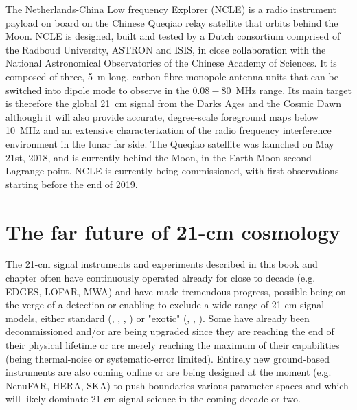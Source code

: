 The Netherlands-China Low frequency Explorer (NCLE) is a radio instrument payload on board on the Chinese Queqiao relay satellite that orbits behind the Moon. 
NCLE is designed, built and tested by a Dutch consortium comprised of the Radboud University, ASTRON and ISIS, in close collaboration with the National Astronomical Observatories of the Chinese Academy of Sciences. It is composed of three, 5~m-long, carbon-fibre monopole antenna units that can be switched into dipole mode to observe in the $0.08-80$~MHz range. Its main target is therefore the global 21~cm signal from the Darks Ages and the Cosmic Dawn although it will also provide accurate, degree-scale foreground maps below 10~MHz and an extensive characterization of the radio frequency interference environment in the lunar far side.
%
The Queqiao satellite was launched on May 21st, 2018, and is currently behind the Moon, in the Earth-Moon second Lagrange point. NCLE is currently being commissioned, with first observations starting before the end of 2019.


\section{The far future of 21-cm cosmology}

The 21-cm signal instruments and experiments described in this book and chapter often have continuously operated already for close to decade (e.g. EDGES, LOFAR, MWA) and have made tremendous progress, possible being on the verge of a detection or enabling to exclude a wide range of 21-cm signal models, either standard (\cite{monsalve17b}, \cite{singh17}, \cite{monsalve18}, \cite{singh18b}) or "exotic" (\cite{barkana18}, \cite{fialkov18}, \cite{fialkov19}). Some have already been decommissioned and/or are being upgraded since they are reaching the end of their physical lifetime or are merely reaching the maximum of their capabilities (being thermal-noise or systematic-error limited). Entirely new ground-based instruments are also coming online or are being designed at the moment (e.g. NenuFAR, HERA, SKA) to push boundaries various parameter spaces and which will likely dominate 21-cm signal science in the coming decade or two. 

